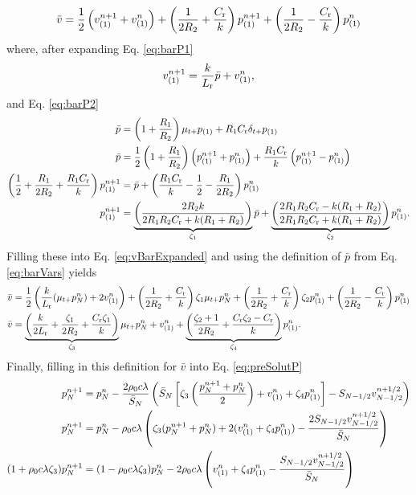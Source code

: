 {\begin{equation}\label{eq:vBarExpanded}
    \bar v = \frac{1}{2}\left(v_{(1)}^{n+1} + v_{(1)}^n\right) + \left(\frac{1}{2R_2} + \frac{C_{\text{r}}}{k}\right) p_{(1)}^{n+1} +\left(\frac{1}{2R_2} - \frac{C_{\text{r}}}{k}\right)p_{(1)}^n
\end{equation}
where, after expanding Eq. \eqref{eq:barP1}
\begin{equation}
    v_{(1)}^{n+1} = \frac{k}{L_{\text{r}}}\bar p + v_{(1)}^n ,
\end{equation}
and Eq. \eqref{eq:barP2}
\begin{align}
    \bar p &= \left(1+\frac{R_1}{R_2}\right)\mu_{t+}p_{(1)}+ R_1 C_{\text{r}}\delta_{t+}p_{(1)}\nonumber\\
    \bar p &= \frac{1}{2}\left(1+\frac{R_1}{R_2}\right)\left(p_{(1)}^{n+1} + p_{(1)}^n\right) + \frac{R_1C_{\text{r}}}{k}\left(p_{(1)}^{n+1} - p_{(1)}^n\right)\nonumber\\
    \left(\frac{1}{2}+\frac{R_1}{2R_2} + \frac{R_1C_{\text{r}}}{k}\right)p_{(1)}^{n+1} &= \bar p + \left(\frac{R_1C_{\text{r}}}{k} - \frac{1}{2} - \frac{R_1}{2R_2}\right)p_{(1)}^n\nonumber\\
    p_{(1)}^{n+1} &= \underbrace{\left(\frac{2R_2k}{2R_1R_2C_{\text{r}} + k(R_1 + R_2)}\right)}_{\zeta_1}\bar p + \underbrace{\left(\frac{2R_1R_2C_{\text{r}} - k(R_1 + R_2)}{2R_1R_2C_{\text{r}} + k(R_1 + R_2)}\right)}_{\zeta_2} p_{(1)}^n .
\end{align}
Filling these into Eq. \eqref{eq:vBarExpanded} and using the definition of $\bar p$ from Eq. \eqref{eq:barVars} yields
\begin{align}
    \bar v &= \frac{1}{2}\left(\frac{k}{L_{\text{r}}}(\mu_{t+}p_N^n) + 2v_{(1)}^n\right)+\left(\frac{1}{2R_2} + \frac{C_{\text{r}}}{k}\right)\zeta_1\mu_{t+}p_N^n + \left(\frac{1}{2R_2} + \frac{C_{\text{r}}}{k}\right)\zeta_2p_{(1)}^n + \left(\frac{1}{2R_2} - \frac{C_{\text{r}}}{k}\right)p_{(1)}^n\nonumber\\
    \bar v &= \underbrace{\left(\frac{k}{2L_{\text{r}}} + \frac{\zeta_1}{2R_2}+\frac{C_{\text{r}}\zeta_1}{k}\right)}_{\zeta_3}\mu_{t+}p_N^n + v_{(1)}^n + \underbrace{\left(\frac{\zeta_2+1}{2R_2} + \frac{C_{\text{r}}\zeta_2 - C_{\text{r}}}{k}\right)}_{\zeta_4}p_{(1)}^n.
\end{align}
Finally, filling in this definition for $\bar v$ into Eq. \eqref{eq:preSolutP}
\begin{align}
    p_N^{n+1} &= p_N^n - \frac{2\rho_0c\lambda}{\bar S_N}\left(\bar S_N
    \left[\zeta_3\left(\frac{p_N^{n+1} + p_N^n}{2}\right) + v_{(1)}^n + \zeta_4p_{(1)}^n\right] - S_{N-1/2}v_{N-1/2}^{n+1/2}\right)\nonumber\\
    p_N^{n+1} &= p_N^n - \rho_0c\lambda\left(\zeta_3(p_N^{n+1} + p_N^n) + 2(v_{(1)}^n + \zeta_4p_{(1)}^n)-\frac{2S_{N-1/2}v_{N-1/2}^{n+1/2}}{\bar S_N}\right)\nonumber\\
    (1+\rho_0c\lambda\zeta_3)p_N^{n+1} &= (1 - \rho_0c\lambda\zeta_3)p_N^n - 2\rho_0c\lambda \left( v_{(1)}^n+\zeta_4p_{(1)}^n - \frac{S_{N-1/2}v_{N-1/2}^{n+1/2}}{\bar S_N}\right)
\end{align}
}
